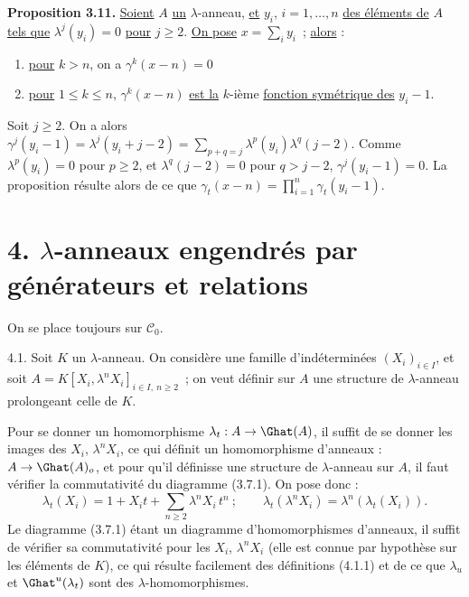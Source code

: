 
\textbf{Proposition 3.11.} \uline{Soient} \(A\) \uline{un} \(\lambda\)-anneau, \uline{et} \(y_i\), \(i=1,\dots,n\) \uline{des éléments de} \(A\) \uline{tels que} \(\lambda^j(y_i)=0\) \uline{pour} \(j\ge2\). \uline{On pose} \(x=\sum_i y_i\)~; \uline{alors} :
\begin{enumerate}[label=\roman*)]
\item \uline{pour} \(k>n\), on a \(\gamma^k(x-n)=0\)
\item \uline{pour} \(1\le k\le n\), \(\gamma^k(x-n)\) \uline{est la} \(k\)-ième \uline{fonction symétrique des} \(y_i-1\).
\end{enumerate}
Soit \(j\ge2\). On a alors \(\gamma^j(y_i-1)=\lambda^j(y_i+j-2)=\sum_{p+q=j}\lambda^p(y_i)\lambda^q(j-2)\). Comme \(\lambda^p(y_i)=0\) pour \(p\ge2\), et \(\lambda^q(j-2)=0\) pour \(q>j-2\), \(\gamma^j(y_i-1)=0\). La proposition résulte alors de ce que \(\gamma_t(x-n)=\prod_{i=1}^{n}\gamma_t(y_i-1)\).

\section*{4. \(\lambda\)-anneaux engendrés par générateurs et relations}

On se place toujours sur \(\mathcal C_0\).

4.1. Soit \(K\) un \(\lambda\)-anneau. On considère une famille d'indéterminées \((X_i)_{i\in I}\), et soit \(A=K[X_i,\lambda^n X_i]_{i\in I,\ n\ge2}\)~; on veut définir sur \(A\) une structure de \(\lambda\)-anneau prolongeant celle de \(K\).

Pour se donner un homomorphisme \(\lambda_t:A\to\Ghat(A)\), il suffit de se donner les images des \(X_i\), \(\lambda^n X_i\), ce qui définit un homomorphisme d'anneaux : \(A\to\Ghat(A)_o\), et pour qu'il définisse une structure de \(\lambda\)-anneau sur \(A\), il faut vérifier la commutativité du diagramme (3.7.1). On pose donc :
\begin{equation}\tag{4.1.1}
  \lambda_t(X_i)=1+X_it+\sum_{n\ge2}\lambda^n X_i\,t^n~;
  \qquad
  \lambda_t(\lambda^n X_i)=\lambda^n(\lambda_t(X_i)).
\end{equation}
Le diagramme (3.7.1) étant un diagramme d'homomorphismes d'anneaux, il suffit de vérifier sa commutativité pour les \(X_i\), \(\lambda^n X_i\) (elle est connue par hypothèse sur les éléments de \(K\)), ce qui résulte facilement des définitions (4.1.1) et de ce que \(\lambda_u\) et \(\Ghat^u(\lambda_t)\) sont des \(\lambda\)-homomorphismes.

